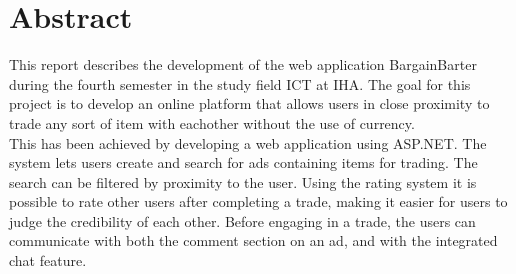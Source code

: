 \section{Abstract}
This report describes the development of the web application BargainBarter during the fourth semester in the study field ICT at IHA. The goal for this project is to develop an online platform that allows users in close proximity to trade any sort of item with eachother without the use of currency. 
\\This has been achieved by developing a web application using ASP.NET. The system lets users create and search for ads containing items for trading. The search can be filtered by proximity to the user. Using the rating system it is possible to rate other users after completing a trade, making it easier for users to judge the credibility of each other. Before engaging in a trade, the users can communicate with both the comment section on an ad, and with the integrated chat feature.




